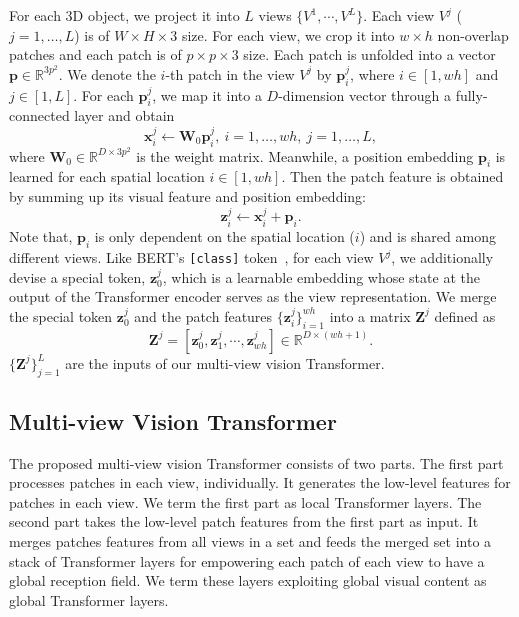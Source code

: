 \documentclass{bmvc2k}
\begin{document}
For each 3D object, we project it into $L$ views $\{V^1,\cdots, V^L\}$. Each view $V^j$ ($j  = 1, \dots, L$) is of  $W\times H \times 3$ size. 
For each view, we crop it into $w\times h$ non-overlap patches and each patch is of $p\times p \times 3$ size. Each patch is unfolded into a vector $\mathbf{p} \in \mathbb{R}^{3p^2}$. We denote  the $i$-th patch in the view $V^j$ by $\mathbf{p}_{i}^j$, where $i\in[1,wh]$ and $j\in[1,L]$. 
For each $\mathbf{p}_{i}^j$, we map it into a $D$-dimension vector through a fully-connected layer and obtain 
\begin{equation}
    \mathbf{x}_i^j \gets \mathbf{W}_0 \mathbf{p}_i^j,~i = 1,\dots, wh,~ j = 1, \dots, L, 
\end{equation}
where $\mathbf{W}_0 \in \mathbb{R}^{D\times 3p^2}$ is the weight matrix.  Meanwhile,  a position embedding $\mathbf{p}_i$ is learned for each spatial location $i\in[1,wh]$. Then the patch feature is obtained by summing up its visual feature and position embedding:
\begin{equation}
    \mathbf{z}_i^j \gets \mathbf{x}_i^j + \mathbf{p}_i.
\end{equation}
Note that, $ \mathbf{p}_i$ is only dependent on the spatial location ($i$) and is shared among different views.
Like BERT's \texttt{[class]} token~\cite{devlin2019bert}, for each view $V^j$, we additionally devise a special token, $\mathbf{z}_0^j$, which is a learnable embedding whose state at the output of the Transformer encoder serves as the view representation. We merge the special token $\mathbf{z}_0^j$ and  the patch features $\{\mathbf{z}_i^j\}_{i=1}^{wh}$ into a matrix $\mathbf{Z}^j$ defined as 
\begin{equation}
\label{input}
    \mathbf{Z}^j = [\mathbf{z}_0^j,\mathbf{z}_1^j,\cdots,\mathbf{z}_{wh}^j] \in \mathbb{R}^{D\times{(wh+1)}}.
\end{equation}
$\{\mathbf{Z}^j\}_{j=1}^L$ are the inputs of our multi-view vision Transformer.

\vspace{-0.1in}
\subsection{Multi-view Vision Transformer}


The proposed multi-view vision Transformer consists of two parts. The first part 
processes patches in each view, individually. It generates the low-level features for patches in each view. We term the first part as local Transformer layers. The second part takes the low-level patch features from the first part as input. It merges patches features from all views in a set and feeds the merged set into a stack of Transformer layers for empowering each patch of each view to have a global reception field. We term these layers exploiting global visual content as global Transformer layers.
\end{document}

